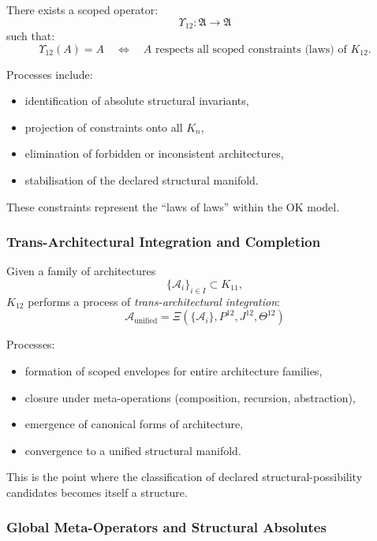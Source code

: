 There exists a scoped operator:
\[
\Upsilon_{12} : \mathfrak{A} \to \mathfrak{A}
\]
such that:
\[
\Upsilon_{12}(A) = A 
\quad \Longleftrightarrow \quad
A \text{ respects all scoped constraints (laws) of } K_{12}.
\]

Processes include:
\begin{itemize}
    \item identification of absolute structural invariants,
    \item projection of constraints onto all $K_n$,
    \item elimination of forbidden or inconsistent architectures,
    \item stabilisation of the declared structural manifold.
\end{itemize}

These constraints represent the ``laws of laws'' within the OK model.

\subsubsection{Trans-Architectural Integration and Completion}

Given a family of architectures
\[
\{\mathcal{A}_i\}_{i \in I} \subset K_{11},
\]
$K_{12}$ performs a process of \emph{trans-architectural integration}:
\[
\mathcal{A}_{\text{unified}} 
= \Xi(\{\mathcal{A}_i\}, P^{12}, J^{12}, \Theta^{12})
\]

Processes:
\begin{itemize}
    \item formation of scoped envelopes for entire architecture families,
    \item closure under meta-operations (composition, recursion, abstraction),
    \item emergence of canonical forms of architecture,
    \item convergence to a unified structural manifold.
\end{itemize}

This is the point where the classification of declared structural-possibility candidates becomes itself a structure.

\subsubsection{Global Meta-Operators and Structural Absolutes}

